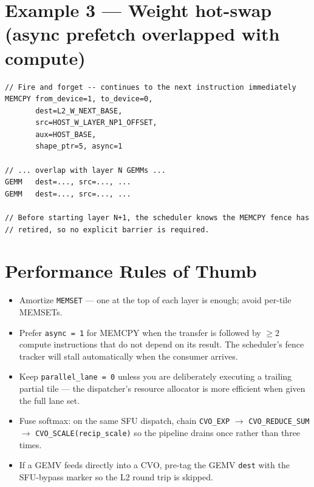 \documentclass[11pt,a4paper,twoside,openany]{report}
\begin{document}
\section{Example 3 --- Weight hot-swap (async prefetch overlapped with compute)}

\begin{lstlisting}[style=sv]
// Fire and forget -- continues to the next instruction immediately
MEMCPY from_device=1, to_device=0,
       dest=L2_W_NEXT_BASE,
       src=HOST_W_LAYER_NP1_OFFSET,
       aux=HOST_BASE,
       shape_ptr=5, async=1

// ... overlap with layer N GEMMs ...
GEMM   dest=..., src=..., ...
GEMM   dest=..., src=..., ...

// Before starting layer N+1, the scheduler knows the MEMCPY fence has
// retired, so no explicit barrier is required.
\end{lstlisting}

\section{Performance Rules of Thumb}

\begin{itemize}[label={\color{oceanblue}\textbullet}, leftmargin=*, itemsep=0.3ex]
    \item Amortize \texttt{MEMSET} --- one at the top of each layer is
          enough; avoid per-tile MEMSETs.
    \item Prefer \texttt{async = 1} for MEMCPY when the transfer is
          followed by $\ge 2$ compute instructions that do not depend
          on its result. The scheduler's fence tracker will stall
          automatically when the consumer arrives.
    \item Keep \texttt{parallel\_lane = 0} unless you are deliberately
          executing a trailing partial tile — the dispatcher's
          resource allocator is more efficient when given the full
          lane set.
    \item Fuse softmax: on the same SFU dispatch, chain
          \texttt{CVO\_EXP} $\to$ \texttt{CVO\_REDUCE\_SUM} $\to$
          \texttt{CVO\_SCALE(recip\_scale)} so the pipeline drains
          once rather than three times.
    \item If a GEMV feeds directly into a CVO, pre-tag the GEMV
          \texttt{dest} with the SFU-bypass marker so the L2 round
          trip is skipped.
\end{itemize}

\newpage
\end{document}
